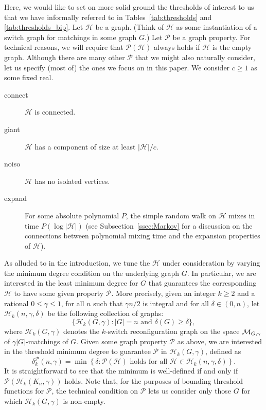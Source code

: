 \documentclass[11pt,a4paper]{article}
\theoremstyle{definition}
\begin{document}
Here, we would like to set on more solid ground the thresholds of interest to us that we have informally referred to in Tables~\ref{tab:thresholds} and \ref{tab:thresholds_bip}.
Let $\mathcal H$ be a graph. 
(Think of $\mathcal H$ as some instantiation of a switch graph for matchings in some graph $G$.)
Let ${\mathcal P}$ be a graph property.
For technical reasons, we will require that ${\mathcal P}({\mathcal H})$ always holds if $\mathcal H$ is the empty graph. Although there are many other $\mathcal P$ that we might also naturally consider, let us specify (most of) the ones we focus on in this paper.
We consider $c\ge 1$ as some fixed real.
\begin{description}
\item[connect] $\mathcal H$ is connected.
\item[giant] $\mathcal H$ has a component of size at least $|{\mathcal H}|/c$.
\item[noiso] $\mathcal H$ has no isolated vertices.
\item[expand] For some absolute polynomial $P$, the simple random walk on
  $\mathcal H$ mixes in time $P(\log |\mathcal H|)$ (see Subsection~\ref{ssec:Markov} for a
  discussion on the connections between polynomial mixing time and the expansion
  properties of $\mathcal H$).
\end{description}

As alluded to in the introduction, we tune the $\mathcal H$ under consideration by varying the minimum degree condition on the underlying graph $G$.
In particular, we are interested in the least minimum degree for $G$ that guarantees the corresponding $\mathcal H$ to have some given property $\mathcal P$.
More precisely, given an integer $k\ge 2$ and a rational $0\le \gamma\le 1$, for all $n$ such that $\gamma n/2$ is integral and for all $\delta \in (0,n)$, let
${\mathcal H}_k(n,\gamma,\delta)$ be the following collection of graphs:
\[
\{{\mathcal H}_{k}(G,\gamma) \colon |G|=n \text{ and }\delta(G)\ge \delta\},
\]
where ${\mathcal H}_k(G,\gamma)$ denotes the $k$-switch reconfiguration graph on the space ${\cal M}_{G,\gamma}$ of $\gamma|G|$-matchings of $G$.
Given some graph property ${\mathcal P}$ as above, we are interested in the threshold minimum degree to guarantee ${\mathcal P}$ in ${\mathcal H}_{k}(G,\gamma)$, defined as
\[
\delta^{\mathcal P}_k(n,\gamma) = \min\left\{ \delta \colon {\mathcal P}({\mathcal H})\text{ holds for all }{\mathcal H}\in {\mathcal H}_k(n,\gamma,\delta) \right\}.
\]
It is straightforward to see that the minimum is well-defined if and only if ${\mathcal P}({\mathcal H}_k(K_n,\gamma))$ holds.
Note that, for the purposes of bounding threshold functions for ${\mathcal P}$, the technical condition on ${\mathcal P}$ lets us consider only those $G$ for which ${\mathcal H}_k(G,\gamma)$ is non-empty.
\end{document}
